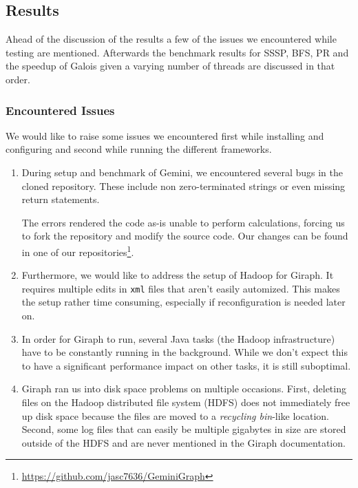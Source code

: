 
\subsection{Results}
Ahead of the discussion of the results a few of the issues we encountered while testing are mentioned. Afterwards the benchmark results for SSSP, BFS, PR and the speedup of Galois given a varying number of threads are discussed in that order.


\subsubsection{Encountered Issues}
We would like to raise some issues we encountered first while installing and configuring and second while running the different frameworks.

\begin{enumerate}
	\item During setup and benchmark of Gemini, we encountered several bugs in the cloned repository. These include non zero-terminated strings or even missing return statements.

	The errors rendered the code as-is unable to perform calculations, forcing us to fork the repository and modify the source code. Our changes can be found in one of our repositories\footnote{\url{https://github.com/jasc7636/GeminiGraph}}.

	\item Furthermore, we would like to address the setup of Hadoop for Giraph. It requires multiple edits in \texttt{xml} files that aren't easily automized. This makes the setup rather time consuming, especially if reconfiguration is needed later on.
	\item In order for Giraph to run, several Java tasks (the Hadoop infrastructure) have to be constantly running in the background. While we don't expect this to have a significant performance impact on other tasks, it is still suboptimal.
	\item Giraph ran us into disk space problems on multiple occasions. First, deleting files on the Hadoop distributed file system (HDFS) does not immediately free up disk space because the files are moved to a \emph{recycling bin}-like location. Second, some log files that can easily be multiple gigabytes in size are stored outside of the HDFS and are never mentioned in the Giraph documentation.
\end{enumerate}


